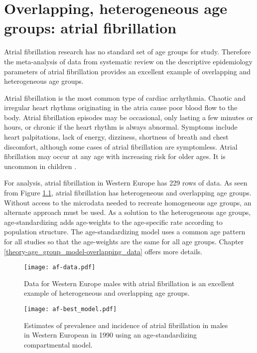 \chapter{Overlapping, heterogeneous age groups: atrial fibrillation}
\label{applications-age_groups}

Atrial fibrillation research has no standard set of age groups for study.  Therefore the meta-analysis of data from systematic review on the descriptive epidemiology parameters of atrial fibrillation provides an excellent example of overlapping and heterogeneous age groups.

Atrial fibrillation is the most common type of cardiac arrhythmia.  Chaotic and irregular heart rhythms originating in the atria cause poor blood flow to the body.  Atrial fibrillation episodes may be occasional, only lasting a few minutes or hours, or chronic if the heart rhythm is always abnormal.  Symptoms include heart palpitations, lack of energy, dizziness, shortness of breath and chest discomfort, although some cases of atrial fibrillation are symptomless.  Atrial fibrillation may occur at any age with increasing risk for older ages.  It is uncommon in children \cite{rich_epidemiology_2009, rho_asymptomoatic_2005, american_acc_2006, radford_atiral_1977}.

For analysis, atrial fibrillation in Western Europe has 229 rows of data.  As seen from Figure \ref{fig:app-af data}, atrial fibrillation has heterogeneous and overlapping age groups.  Without access to the microdata needed to recreate homogeneous age groups, an alternate approach must be used.  As a solution to the heterogeneous age groups, age-standardizing adds age-weights to the age-specific rate according to population structure.  The age-standardizing model uses a common age pattern for all studies so that the age-weights are the same for all age groups.  Chapter \ref{theory-age_group_model-overlapping_data} offers more details.

    \begin{figure}[h]
        \begin{center}
            \texttt{[image: af-data.pdf]}
            \caption{Data for Western Europe males with atrial fibrillation is an excellent example of heterogeneous and overlapping age groups.}
            \label{fig:app-af data}
        \end{center}
    \end{figure}

    \begin{figure}[h]
        \begin{center}
            \texttt{[image: af-best\_model.pdf]}
            \caption{Estimates of prevalence and incidence of atrial fibrillation in males in Western European in 1990 using an age-standardizing compartmental model.}
            \label{fig:app-af age-stand}
        \end{center}
    \end{figure}

